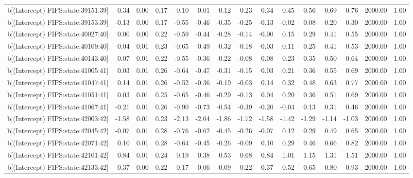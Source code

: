 \begin{table}[ht]
\begin{tabular}{rrrrrrrrrrrrrrr}
  b[(Intercept) FIPS:state:39151:39] & 0.34 & 0.00 & 0.17 & -0.10 & 0.01 & 0.12 & 0.23 & 0.34 & 0.45 & 0.56 & 0.69 & 0.76 & 2000.00 & 1.00 \\ 
  b[(Intercept) FIPS:state:39153:39] & -0.13 & 0.00 & 0.17 & -0.55 & -0.46 & -0.35 & -0.25 & -0.13 & -0.02 & 0.08 & 0.20 & 0.30 & 2000.00 & 1.00 \\ 
  b[(Intercept) FIPS:state:40027:40] & 0.00 & 0.00 & 0.22 & -0.59 & -0.44 & -0.28 & -0.14 & -0.00 & 0.15 & 0.29 & 0.41 & 0.55 & 2000.00 & 1.00 \\ 
  b[(Intercept) FIPS:state:40109:40] & -0.04 & 0.01 & 0.23 & -0.65 & -0.49 & -0.32 & -0.18 & -0.03 & 0.11 & 0.25 & 0.41 & 0.53 & 2000.00 & 1.00 \\ 
  b[(Intercept) FIPS:state:40143:40] & 0.07 & 0.01 & 0.22 & -0.55 & -0.36 & -0.22 & -0.08 & 0.08 & 0.23 & 0.35 & 0.50 & 0.64 & 2000.00 & 1.00 \\ 
  b[(Intercept) FIPS:state:41005:41] & 0.03 & 0.01 & 0.26 & -0.64 & -0.47 & -0.31 & -0.15 & 0.03 & 0.21 & 0.36 & 0.55 & 0.69 & 2000.00 & 1.00 \\ 
  b[(Intercept) FIPS:state:41047:41] & 0.14 & 0.01 & 0.26 & -0.52 & -0.36 & -0.19 & -0.03 & 0.14 & 0.32 & 0.48 & 0.63 & 0.77 & 2000.00 & 1.00 \\ 
  b[(Intercept) FIPS:state:41051:41] & 0.03 & 0.01 & 0.25 & -0.65 & -0.46 & -0.29 & -0.13 & 0.04 & 0.20 & 0.36 & 0.51 & 0.69 & 2000.00 & 1.00 \\ 
  b[(Intercept) FIPS:state:41067:41] & -0.21 & 0.01 & 0.26 & -0.90 & -0.73 & -0.54 & -0.39 & -0.20 & -0.04 & 0.13 & 0.31 & 0.46 & 2000.00 & 1.00 \\ 
  b[(Intercept) FIPS:state:42003:42] & -1.58 & 0.01 & 0.23 & -2.13 & -2.04 & -1.86 & -1.72 & -1.58 & -1.42 & -1.29 & -1.14 & -1.03 & 2000.00 & 1.00 \\ 
  b[(Intercept) FIPS:state:42045:42] & -0.07 & 0.01 & 0.28 & -0.76 & -0.62 & -0.45 & -0.26 & -0.07 & 0.12 & 0.29 & 0.49 & 0.65 & 2000.00 & 1.00 \\ 
  b[(Intercept) FIPS:state:42071:42] & 0.10 & 0.01 & 0.28 & -0.64 & -0.45 & -0.26 & -0.09 & 0.10 & 0.29 & 0.46 & 0.66 & 0.82 & 2000.00 & 1.00 \\ 
  b[(Intercept) FIPS:state:42101:42] & 0.84 & 0.01 & 0.24 & 0.19 & 0.38 & 0.53 & 0.68 & 0.84 & 1.01 & 1.15 & 1.31 & 1.51 & 2000.00 & 1.00 \\ 
  b[(Intercept) FIPS:state:42133:42] & 0.37 & 0.00 & 0.22 & -0.17 & -0.06 & 0.09 & 0.22 & 0.37 & 0.52 & 0.65 & 0.80 & 0.93 & 2000.00 & 1.00 \\ 

\end{tabular}
\end{table}
